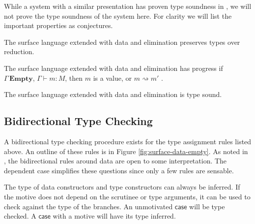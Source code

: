 While a system with a similar presentation has proven type soundness
in \cite{sjoberg2012irrelevance}
, we will not prove the type soundness of the system here. For clarity
we will list the important properties as conjectures.
\begin{conjecture}
The surface language extended with data and elimination preserves
types over reduction.
\end{conjecture}

\begin{conjecture}
The surface language extended with data and elimination has progress
if $\Gamma\,\mathbf{Empty}$, \textup{$\Gamma\vdash m:M$}, then $m$
is a value, or $m\rightsquigarrow m'$ .
\end{conjecture}

\begin{conjecture}
The surface language extended with data and elimination is type sound.
\end{conjecture}


\subsection{Bidirectional Type Checking}

A bidirectional type checking procedure exists for the type assignment
rules listed above. An outline of these rules is in Figure \ref{fig:surface-data-empty}.
As noted in \cite{10.1145/3450952}, the bidirectional rules around
data are open to some interpretation. The dependent case simplifies
these questions since only a few rules are sensable.

The type of data constructors and type constructors can always be
inferred. If the motive does not depend on the scrutinee or type arguments,
it can be used to check against the type of the branches. An unmotivated
$\mathsf{case}$ will be type checked. A $\mathsf{case}$ with a motive
will have its type inferred.

